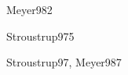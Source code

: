 \begin{syllabus}
\begin{unit}{\PLFOURDef}{Meyer98}{2}
   \begin{topics}
      \item \PLFOURTopicLa
      \item \PLFOURTopicDeclaracion
      \item \PLFOURTopicVista
      \item \PLFOURTopicRecoleccion
   \end{topics}

   \begin{learningoutcomes}
      \item \PLFOURObjONE
      \item \PLFOURObjTWO
      \item \PLFOURObjTHREE
      \item \PLFOURObjFOUR
      \item \PLFOURObjFIVE
      \item \PLFOURObjSIX
   \end{learningoutcomes}
\end{unit}

\begin{unit}{\PLFIVEDef}{Stroustrup97}{5}
   \begin{topics}
      \item \PLFIVETopicProcedimientos
      \item \PLFIVETopicMecanismos
      \item \PLFIVETopicRegistros
      \item \PLFIVETopicParametros
      \item \PLFIVETopicModulos
   \end{topics}

   \begin{learningoutcomes}
      \item \PLFIVEObjONE
      \item \PLFIVEObjTWO
      \item \PLFIVEObjTHREE
      \item \PLFIVEObjFOUR
   \end{learningoutcomes}
\end{unit}

\begin{unit}{\PLSIXDef}{Stroustrup97, Meyer98}{7}
   \begin{topics}
      \item \PLSIXTopicDiseno
      \item \PLSIXTopicEncapsulacion
      \item \PLSIXTopicSeparacion
      \item \PLSIXTopicClases
      \item \PLSIXTopicHerencia
      \item \PLSIXTopicPolimorfismo
      \item \PLSIXTopicJerarquias
      \item \PLSIXTopicColeccion
      \item \PLSIXTopicRepresentaciones
   \end{topics}


\end{unit}
\end{syllabus}
